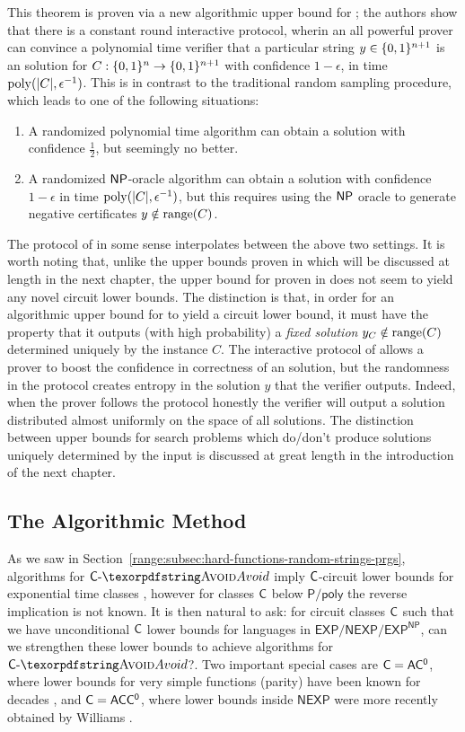 This theorem is proven via a new algorithmic upper bound for \avoid; the authors show that there is a constant round interactive protocol, wherin an all powerful prover can convince a polynomial time verifier that a particular string $y \in \{0,1\}^{n+1}$ is an \avoid solution for $C: \{0,1\}^n \to \{0,1\}^{n+1}$ with confidence $1 - \epsilon$, in time $\mathrm{poly}(|C|, \epsilon^{-1})$. This is in contrast to the traditional random sampling procedure, which leads to one of the following situations:
\begin{enumerate}
    \item A randomized polynomial time algorithm can obtain a solution with confidence $\frac{1}{2}$, but seemingly no better.
    \item A randomized $\cl{NP}$-oracle algorithm can obtain a solution with confidence $1-\epsilon$ in time $\mathrm{poly}(|C|,\epsilon^{-1})$, but this requires using the $\cl{NP}$ oracle to generate negative certificates $y \notin \mathrm{range}(C)$.
\end{enumerate}
The protocol of \cite{GLS25} in some sense interpolates between the above two settings. It is worth noting that, unlike the \avoid upper bounds proven in \cite{CHR, Li, KP24} which will be discussed at length in the next chapter, the upper bound for \avoid proven in \cite{GLS25} does not seem to yield any novel circuit lower bounds. The distinction is that, in order for an algorithmic upper bound for \avoid to yield a circuit lower bound, it must have the property that it outputs (with high probability) a \emph{fixed solution} $y_C \notin \mathrm{range}(C)$ determined uniquely by the instance $C$. The interactive protocol of \cite{GLS25} allows a prover to boost the confidence in correctness of an \avoid solution, but the randomness in the protocol creates entropy in the solution $y$ that the verifier outputs. Indeed, when the prover follows the protocol honestly the verifier will output a solution distributed almost uniformly on the space of all solutions. The distinction between upper bounds for search problems which do/don't produce solutions uniquely determined by the input is discussed at great length in the introduction of the next chapter.
\subsection{The Algorithmic Method}

As we saw in Section~\ref{range:subsec:hard-functions-random-strings-prgs}, algorithms for $\cl{C}\dash \avoid$ imply $\cl{C}$-circuit lower bounds for exponential time classes \cite{RSW}, however for classes $\cl{C}$ below $\mathsf{P/poly}$ the reverse implication is not known. It is then natural to ask: for circuit classes $\cl{C}$ such that we have unconditional $\cl{C}$ lower bounds for languages in $\mathsf{EXP}/\mathsf{NEXP}/ \mathsf{EXP^{NP}}$, can we strengthen these lower bounds to achieve algorithms for $\cl{C}\dash\avoid$?. Two important special cases are $\cl{C} = \mathsf{AC^0}$, where lower bounds for very simple functions (parity) have been known for decades \cite{FSS,Ajtai83}, and $\cl{C}=\cl{ACC^0}$, where lower bounds inside $\mathsf{NEXP}$ were more recently obtained by Williams \cite{ryan-acc}. 

